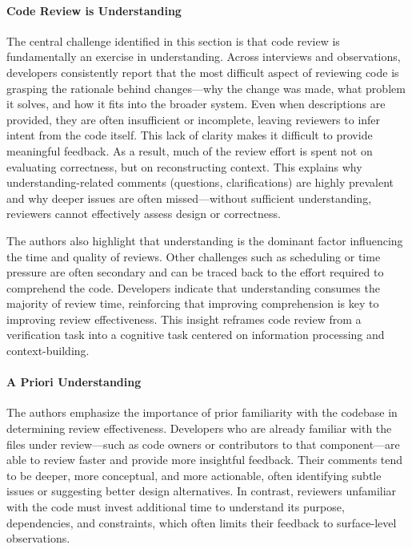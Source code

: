 \paragraph{Code Review is Understanding}
The central challenge identified in this section is that code review is fundamentally an exercise in understanding. Across interviews and observations, developers consistently report that the most difficult aspect of reviewing code is grasping the rationale behind changes—why the change was made, what problem it solves, and how it fits into the broader system. Even when descriptions are provided, they are often insufficient or incomplete, leaving reviewers to infer intent from the code itself. This lack of clarity makes it difficult to provide meaningful feedback. As a result, much of the review effort is spent not on evaluating correctness, but on reconstructing context. This explains why understanding-related comments (questions, clarifications) are highly prevalent and why deeper issues are often missed—without sufficient understanding, reviewers cannot effectively assess design or correctness.

The authors also highlight that understanding is the dominant factor influencing the time and quality of reviews. Other challenges such as scheduling or time pressure are often secondary and can be traced back to the effort required to comprehend the code. Developers indicate that understanding consumes the majority of review time, reinforcing that improving comprehension is key to improving review effectiveness. This insight reframes code review from a verification task into a cognitive task centered on information processing and context-building.

\paragraph{A Priori Understanding}
The authors emphasize the importance of prior familiarity with the codebase in determining review effectiveness. Developers who are already familiar with the files under review—such as code owners or contributors to that component—are able to review faster and provide more insightful feedback. Their comments tend to be deeper, more conceptual, and more actionable, often identifying subtle issues or suggesting better design alternatives. In contrast, reviewers unfamiliar with the code must invest additional time to understand its purpose, dependencies, and constraints, which often limits their feedback to surface-level observations.

